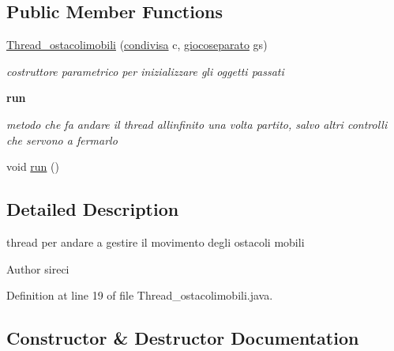 \subsection*{Public Member Functions}
\begin{DoxyCompactItemize}
\item 
\hyperlink{classcargame_1_1_thread__ostacolimobili_a8e127bb727abd6831ab506f87106c8dd}{Thread\+\_\+ostacolimobili} (\hyperlink{classcargame_1_1condivisa}{condivisa} c, \hyperlink{classcargame_1_1giocoseparato}{giocoseparato} gs)
\begin{DoxyCompactList}\small\item\em costruttore parametrico per inizializzare gli oggetti passati \end{DoxyCompactList}\end{DoxyCompactItemize}
\begin{Indent}\textbf{ run}\par
{\em metodo che fa andare il thread all\textquotesingle{}infinito una volta partito, salvo altri controlli che servono a fermarlo }\begin{DoxyCompactItemize}
\item 
void \hyperlink{classcargame_1_1_thread__ostacolimobili_a13a43e6d814de94978c515cb084873b1}{run} ()
\end{DoxyCompactItemize}
\end{Indent}


\subsection{Detailed Description}
thread per andare a gestire il movimento degli ostacoli mobili 

\begin{DoxyAuthor}{Author}
sireci 
\end{DoxyAuthor}


Definition at line 19 of file Thread\+\_\+ostacolimobili.\+java.



\subsection{Constructor \& Destructor Documentation}
\mbox{\label{classcargame_1_1_thread__ostacolimobili_a8e127bb727abd6831ab506f87106c8dd}} 
